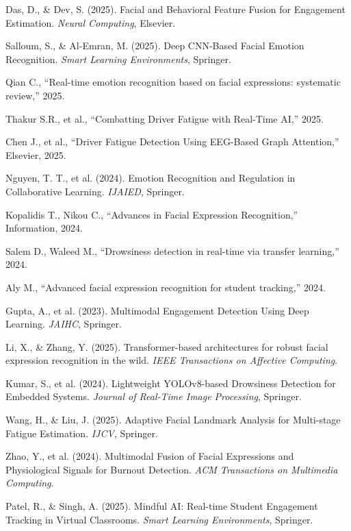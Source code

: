 \documentclass[conference]{IEEEtran}
\begin{document}
\begin{enumerate}[label={[\arabic*]}, leftmargin=*, itemsep=4pt]
    \item Das, D., \& Dev, S. (2025). Facial and Behavioral Feature Fusion for Engagement Estimation. \textit{Neural Computing}, Elsevier.
    \item Salloum, S., \& Al-Emran, M. (2025). Deep CNN-Based Facial Emotion Recognition. \textit{Smart Learning Environments}, Springer.
    \item Qian C., ``Real-time emotion recognition based on facial expressions: systematic review,'' 2025.
    \item Thakur S.R., et al., ``Combatting Driver Fatigue with Real-Time AI,'' 2025.
    \item Chen J., et al., ``Driver Fatigue Detection Using EEG-Based Graph Attention,'' Elsevier, 2025.
    \item Nguyen, T. T., et al. (2024). Emotion Recognition and Regulation in Collaborative Learning. \textit{IJAIED}, Springer.
    \item Kopalidis T., Nikou C., ``Advances in Facial Expression Recognition,'' Information, 2024.
    \item Salem D., Waleed M., ``Drowsiness detection in real-time via transfer learning,'' 2024.
    \item Aly M., ``Advanced facial expression recognition for student tracking,'' 2024.
    \item Gupta, A., et al. (2023). Multimodal Engagement Detection Using Deep Learning. \textit{JAIHC}, Springer.
    \item Li, X., \& Zhang, Y. (2025). Transformer-based architectures for robust facial expression recognition in the wild. \textit{IEEE Transactions on Affective Computing}.
    \item Kumar, S., et al. (2024). Lightweight YOLOv8-based Drowsiness Detection for Embedded Systems. \textit{Journal of Real-Time Image Processing}, Springer.
    \item Wang, H., \& Liu, J. (2025). Adaptive Facial Landmark Analysis for Multi-stage Fatigue Estimation. \textit{IJCV}, Springer.
    \item Zhao, Y., et al. (2024). Multimodal Fusion of Facial Expressions and Physiological Signals for Burnout Detection. \textit{ACM Transactions on Multimedia Computing}.
    \item Patel, R., \& Singh, A. (2025). Mindful AI: Real-time Student Engagement Tracking in Virtual Classrooms. \textit{Smart Learning Environments}, Springer.

\end{enumerate}
\end{document}
